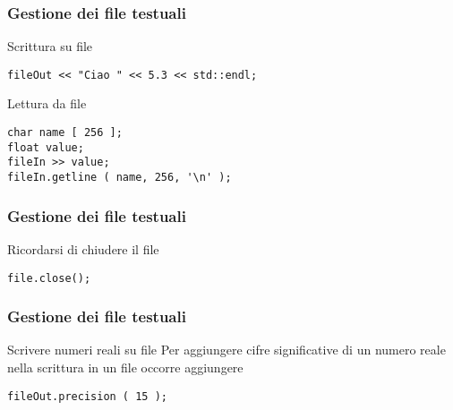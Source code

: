 \documentclass{beamer}
\begin{document}

\begin{frame}[fragile]

    \frametitle{Gestione dei file testuali}

    \begin{block}{Scrittura su file}
        \begin{verbatim}
fileOut << "Ciao " << 5.3 << std::endl;
        \end{verbatim}
    \end{block}

    \begin{block}{Lettura da file}
        \begin{verbatim}
char name [ 256 ];
float value;
fileIn >> value;
fileIn.getline ( name, 256, '\n' );
        \end{verbatim}
    \end{block}

\end{frame}


\begin{frame}[fragile]

    \frametitle{Gestione dei file testuali}

    \begin{block}{Ricordarsi di chiudere il file}
        \begin{verbatim}
file.close();
        \end{verbatim}
    \end{block}

\end{frame}


\begin{frame}[fragile]

    \frametitle{Gestione dei file testuali}

    \begin{block}{Scrivere numeri reali su file}
        Per aggiungere cifre significative di un numero reale
        nella scrittura in un file occorre aggiungere
        \begin{verbatim}
fileOut.precision ( 15 );
        \end{verbatim}
    \end{block}

\end{frame}

\end{document}
